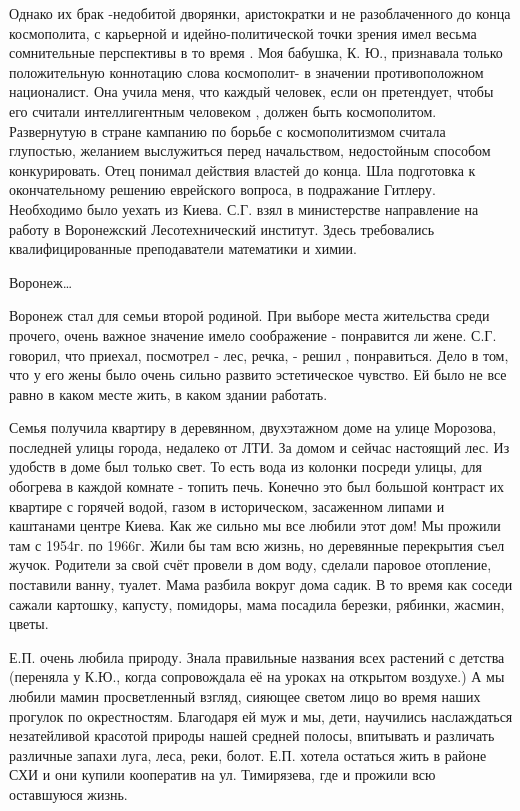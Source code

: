 Однако их брак -недобитой дворянки, аристократки и не разоблаченного до конца космополита, с карьерной и идейно-полити\-ческой точки зрения имел весьма сомнительные перспективы в то время . Моя бабушка, К. Ю., признавала только положительную коннотацию слова космополит- в значении противоположном националист. Она учила меня, что каждый человек, если он претендует, чтобы его считали интеллигентным человеком , должен быть космополитом. Развернутую в стране кампанию по борьбе с космополитизмом считала глупостью, желанием выслужиться перед начальством, недостойным способом конкурировать. Отец понимал действия властей до конца. Шла подготовка к окончательному решению еврейского вопроса, в подражание Гитлеру. Необходимо было уехать из Киева. С.Г. взял в министерстве направление на работу в Воронежский Лесотехнический институт. Здесь требовались квалифицированные преподаватели математики и химии.

Воронеж…

Воронеж стал для семьи второй родиной. При выборе места жительства среди прочего, очень важное значение имело соображение - понравится ли жене. С.Г. говорил, что приехал, посмотрел - лес, речка, - решил , понравиться. Дело в том, что у его жены было очень сильно развито эстетическое чувство. Ей было не все равно в каком месте жить, в каком здании работать.

Семья получила квартиру в деревянном, двухэтажном доме на улице Морозова, последней улицы города, недалеко от ЛТИ. За домом и сейчас настоящий лес. Из удобств в доме был только свет. То есть вода из колонки посреди улицы, для обогрева в каждой комнате - топить печь. Конечно это был большой контраст их квартире с горячей водой, газом в историческом, засаженном липами и каштанами центре Киева.
Как же сильно мы все любили этот дом! Мы прожили там с 1954г. по 1966г. Жили бы там всю жизнь, но деревянные перекрытия съел жучок. Родители за свой счёт провели в дом воду, сделали паровое отопление, поставили ванну, туалет. Мама разбила вокруг дома садик. В то время как соседи сажали картошку, капусту, помидоры, мама посадила березки, рябинки, жасмин, цветы.

Е.П. очень любила природу. Знала правильные названия всех растений с детства (переняла у К.Ю., когда сопровождала её на уроках на открытом воздухе.) А мы любили мамин просветленный взгляд, сияющее светом лицо во время наших прогулок по окрестностям. Благодаря ей муж и мы, дети, научились наслаждаться незатейливой красотой природы нашей средней полосы, впитывать и различать различные запахи луга, леса, реки, болот.
Е.П. хотела остаться жить в районе СХИ и они купили кооператив на ул. Тимирязева, где и прожили всю оставшуюся жизнь.

